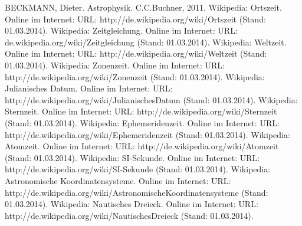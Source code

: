\documentclass[titlepage]{scrartcl}
\begin{document}
\newpage

\begin{thebibliography}{9}
 BECKMANN, Dieter. Astrophysik. C.C.Buchner, 2011.
 Wikipedia: Ortszeit. Online im Internet: URL: http://de.wikipedia.org/wiki/Ortszeit (Stand: 01.03.2014). 
 Wikipedia: Zeitgleichung. Online im Internet: URL: de.wikipedia.org/wiki/Zeitgleichung (Stand: 01.03.2014). 
 Wikipedia: Weltzeit. Online im Internet: URL: http://de.wikipedia.org/wiki/Weltzeit (Stand: 01.03.2014). 
 Wikipedia: Zonenzeit. Online im Internet: URL: http://de.wikipedia.org/wiki/Zonenzeit (Stand: 01.03.2014). 
 Wikipedia: Julianisches Datum. Online im Internet: URL: http://de.wikipedia.org/wiki/JulianischesDatum (Stand: 01.03.2014). 
 Wikipedia: Sternzeit. Online im Internet: URL: http://de.wikipedia.org/wiki/Sternzeit (Stand: 01.03.2014). 
 Wikipedia: Ephemeridenzeit. Online im Internet: URL: http://de.wikipedia.org/wiki/Ephemeridenzeit (Stand: 01.03.2014). 
 Wikipedia: Atomzeit. Online im Internet: URL: http://de.wikipedia.org/wiki/Atomzeit (Stand: 01.03.2014). 
 Wikipedia: SI-Sekunde. Online im Internet: URL: http://de.wikipedia.org/wiki/SI-Sekunde (Stand: 01.03.2014). 
 Wikipedia: Astronomische Koordinatensysteme. Online im Internet: URL: http://de.wikipedia.org/wiki/Astronomische\textunderscore Koordinatensysteme (Stand: 01.03.2014). 
 Wikipedia: Nautisches Dreieck. Online im Internet: URL: http://de.wikipedia.org/wiki/NautischesDreieck (Stand: 01.03.2014). 

\end{thebibliography}
\end{document}
